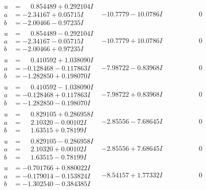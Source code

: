 \documentclass[1p]{elsarticle_modified}
\theoremstyle{definition}
\begin{document}
$$\begin{array}{c|c|c}
\begin{aligned}
u &= \phantom{-}0.854489 + 0.292104 I \\
a &= -2.34167 + 0.05715 I \\
b &= -2.00466 - 0.97235 I\end{aligned}
 & -10.7779 - 10.0786 I & \phantom{-0.000000 } 0 \\ \hline\begin{aligned}
u &= \phantom{-}0.854489 - 0.292104 I \\
a &= -2.34167 - 0.05715 I \\
b &= -2.00466 + 0.97235 I\end{aligned}
 & -10.7779 + 10.0786 I & \phantom{-0.000000 } 0 \\ \hline\begin{aligned}
u &= \phantom{-}0.410592 + 1.038090 I \\
a &= -0.128468 - 0.117863 I \\
b &= -1.282850 + 0.198070 I\end{aligned}
 & -7.98722 - 0.83968 I & \phantom{-0.000000 } 0 \\ \hline\begin{aligned}
u &= \phantom{-}0.410592 - 1.038090 I \\
a &= -0.128468 + 0.117863 I \\
b &= -1.282850 - 0.198070 I\end{aligned}
 & -7.98722 + 0.83968 I & \phantom{-0.000000 } 0 \\ \hline\begin{aligned}
u &= \phantom{-}0.829105 + 0.286958 I \\
a &= \phantom{-}2.10320 - 0.00102 I \\
b &= \phantom{-}1.63515 + 0.78199 I\end{aligned}
 & -2.85556 - 7.68645 I & \phantom{-0.000000 } 0 \\ \hline\begin{aligned}
u &= \phantom{-}0.829105 - 0.286958 I \\
a &= \phantom{-}2.10320 + 0.00102 I \\
b &= \phantom{-}1.63515 - 0.78199 I\end{aligned}
 & -2.85556 + 7.68645 I & \phantom{-0.000000 } 0 \\ \hline\begin{aligned}
u &= -0.701766 + 0.880022 I \\
a &= -0.179014 - 0.153824 I \\
b &= -1.302540 - 0.384385 I\end{aligned}
 & -8.54157 + 1.77332 I & \phantom{-0.000000 } 0 \\ \hline\begin{aligned}

\end{aligned}
\end{array}$$
\end{document}
